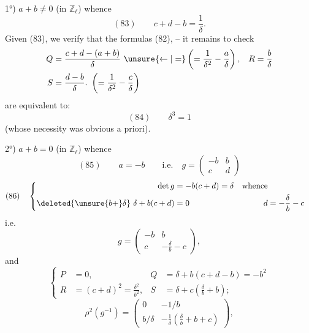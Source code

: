 


1°) $a+b\ne0$ (in $\mathbb Z_\ell$) whence
\[
(83)\qquad\boxed{c+d-b=\frac1\delta}.
\]
Given (83), we verify that the formulas (82), --  it remains to check
\[
\begin{aligned}
Q&=\frac{c+d-(a+b)}\delta\ \unsure{\leftarrow|=}\left(=\frac1{\delta^2}-\frac a\delta\right),&R&=\frac b\delta\\
S&=\frac{d-b}\delta.\ \left(=\frac1{\delta^2}-\frac c\delta\right)
\end{aligned}
\]
are equivalent to:
\[
(84)\qquad\boxed{\delta^3=1}
\]
(whose necessity was obvious a priori).


2°) $a+b=0$ (in $\mathbb Z_\ell$) whence
\[
(85)\qquad a=-b\qquad\text{i.e.}\quad g=\begin{pmatrix}-b&b\\c&d\end{pmatrix}
\]
\[
(86)\quad\left\{\begin{aligned}
\det g&=-b(c+d)=\delta&\text{whence}\\
\deleted{\unsure{b+}\delta}\ \delta+b(c+d)&=0&d&=-\frac\delta b-c
\end{aligned}\right.
\]
i.e.
\[
g=\begin{pmatrix}-b&b\\c&-\frac\delta b-c\end{pmatrix},
\]
and
\[
\left\{\begin{aligned}
P&=0,&Q&=\delta+b(c+d-b)=-b^2\\
R&=(c+d)^2=\frac{\delta^2}{b^2},&S&=\delta+c\left(\frac\delta b+b\right);
\end{aligned}\right.
\]
\[
\rho^2(g^{-1})=\begin{pmatrix}0&-1/b\\b/\delta&-\frac1\delta\left(\frac\delta b+b+c\right)\end{pmatrix},
\]

